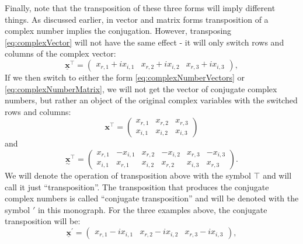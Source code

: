 \documentclass[
]{book}
\begin{document}
Finally, note that the transposition of these three forms will imply different things. As discussed earlier, in vector and matrix forms transposition of a complex number implies the conjugation. However, transposing \eqref{eq:complexVector} will not have the same effect - it will only switch rows and columns of the complex vector:
\begin{equation}
    \underline{\mathbf{x}}^{\top} = \begin{pmatrix} x_{r,1} + i x_{i,1} & x_{r,2} + i x_{i,2} & x_{r,3} + i x_{i,3}
                        \end{pmatrix} ,
    \label{eq:complexVectorTransposed}
\end{equation}
If we then switch to either the form \eqref{eq:complexNumberVectors} or \eqref{eq:complexNumberMatrix}, we will not get the vector of conjugate complex numbers, but rather an object of the original complex variables with the switched rows and columns:
\begin{equation}
    {\mathbf{x}}^{\top} = \begin{pmatrix} x_{r,1} & x_{r,2} & x_{r,3} \\
                                 x_{i,1} & x_{i,2} & x_{i,3}
                        \end{pmatrix} 
    \label{eq:complexVectorMatrixTransposed}
\end{equation}
and
\begin{equation}
    \underset{\sim}{\mathbf{x}}^{\top} = \begin{pmatrix} x_{r,1} & - x_{i,1} & x_{r,2} & - x_{i,2} & x_{r,3} & - x_{i,3} \\
                                        x_{i,1} & x_{r,1} & x_{i,2} & x_{r,2} & x_{i,3} & x_{r,3}
                        \end{pmatrix} .
    \label{eq:complexMatrixTransposed}
\end{equation}
We will denote the operation of transposition above with the symbol \(\top\) and will call it just ``transposition''. The transposition that produces the conjugate complex numbers is called ``conjugate transposition'' and will be denoted with the symbol \(\prime\) in this monograph. For the three examples above, the conjugate transposition will be:
\begin{equation}
    \underline{\mathbf{x}}^{\prime} = \begin{pmatrix} x_{r,1} - i x_{i,1} & x_{r,2} - i x_{i,2} & x_{r,3} - i x_{i,3}
                        \end{pmatrix} ,
    \label{eq:complexVectorTransposedConj}
\end{equation}
\end{document}
